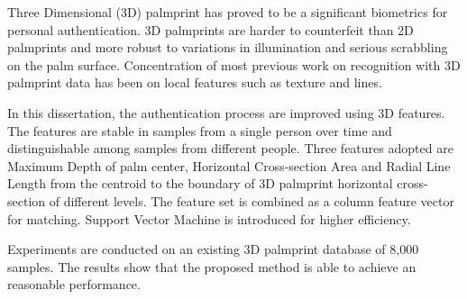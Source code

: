 
Three Dimensional (3D) palmprint has proved to be a significant biometrics for personal authentication. 3D palmprints are harder to counterfeit than 2D palmprints and more robust to variations in illumination and serious scrabbling on the palm surface. Concentration of most previous work on recognition with 3D palmprint data has been on local features such as texture and lines.

In this dissertation, the authentication process are improved using 3D features. The features are stable in samples from a single person over time and distinguishable among samples from different people. Three features adopted are Maximum Depth of palm center, Horizontal Cross-section Area and Radial Line Length from the centroid to the boundary of 3D palmprint horizontal cross-section of different levels. The feature set is combined as a column feature vector for matching. Support Vector Machine is introduced for higher efficiency.

Experiments are conducted on an existing 3D palmprint database of 8,000 samples. The results show that the proposed method is able to achieve an reasonable performance.


